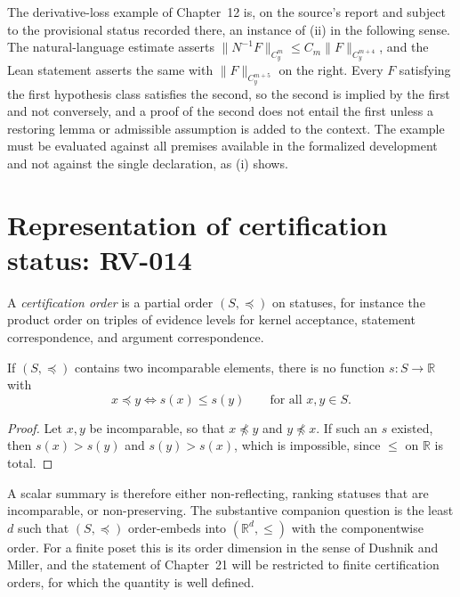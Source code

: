 The derivative-loss example of Chapter~12 is, on the source's report and subject to the provisional status recorded there, an instance of (ii) in the following sense. The natural-language estimate asserts $\|N^{-1}F\|_{C^m_y} \le C_m \|F\|_{C^{m+4}_y}$, and the Lean statement asserts the same with $\|F\|_{C^{m+5}_y}$ on the right. Every $F$ satisfying the first hypothesis class satisfies the second, so the second is implied by the first and not conversely, and a proof of the second does not entail the first unless a restoring lemma or admissible assumption is added to the context. The example must be evaluated against all premises available in the formalized development and not against the single declaration, as (i) shows.

\section{Representation of certification status: RV-014}

\begin{definition}
A \emph{certification order} is a partial order $(S, \preceq)$ on statuses, for instance the product order on triples of evidence levels for kernel acceptance, statement correspondence, and argument correspondence.
\end{definition}

\begin{proposition}
\label{prop:scalar}
If $(S,\preceq)$ contains two incomparable elements, there is no function $s : S \to \mathbb{R}$ with
\[
x \preceq y \iff s(x) \le s(y) \qquad \text{for all } x, y \in S.
\]
\end{proposition}

\begin{proof}
Let $x, y$ be incomparable, so that $x \not\preceq y$ and $y \not\preceq x$. If such an $s$ existed, then $s(x) > s(y)$ and $s(y) > s(x)$, which is impossible, since $\le$ on $\mathbb{R}$ is total.
\end{proof}

A scalar summary is therefore either non-reflecting, ranking statuses that are incomparable, or non-preserving. The substantive companion question is the least $d$ such that $(S, \preceq)$ order-embeds into $(\mathbb{R}^d, \le)$ with the componentwise order. For a finite poset this is its order dimension in the sense of Dushnik and Miller, and the statement of Chapter~21 will be restricted to finite certification orders, for which the quantity is well defined.


